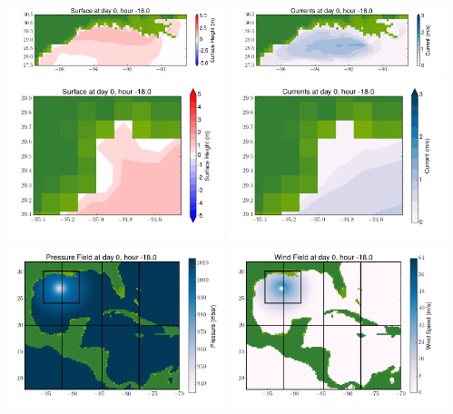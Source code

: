 \documentclass[11pt]{article}
\begin{document}
\includegraphics[width=0.475\textwidth]{frame0054fig4.png}
\vskip 10pt 
\includegraphics[width=0.475\textwidth]{frame0054fig5.png}
\includegraphics[width=0.475\textwidth]{frame0054fig6.png}
\vskip 10pt 
\includegraphics[width=0.475\textwidth]{frame0054fig7.png}
\includegraphics[width=0.475\textwidth]{frame0054fig8.png}
\vskip 10pt 
\includegraphics[width=0.475\textwidth]{frame0054fig9.png}
\end{document}
